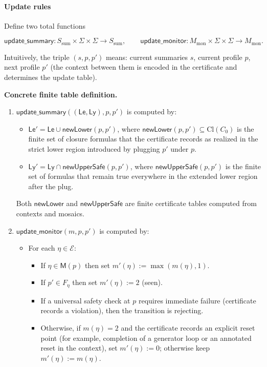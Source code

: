 \documentclass[11pt]{article}
\newcommand{\Cl}{\mathrm{Cl}}
\begin{document}
\paragraph{Update rules}
Define two total functions


\[
\mathsf{update\_summary}: S_{\mathrm{sum}}\times\Sigma\times\Sigma\to S_{\mathrm{sum}},
\qquad
\mathsf{update\_monitor}: M_{\mathrm{mon}}\times\Sigma\times\Sigma\to M_{\mathrm{mon}}.
\]


Intuitively, the triple $(s,p,p')$ means: current summaries $s$, current
profile $p$, next profile $p'$ (the context between them is encoded in the
certificate and determines the update table).

\textbf{Concrete finite table definition.}
\begin{enumerate}
  \item $\mathsf{update\_summary}((\mathsf{Le},\mathsf{Ly}),p,p')$ is computed by:
    \begin{itemize}
      \item $\mathsf{Le}'=\mathsf{Le}\cup \mathsf{newLower}(p,p')$, where
        $\mathsf{newLower}(p,p')\subseteq\Cl(C_0)$ is the finite set of closure
        formulas that the certificate records as realized in the strict lower
        region introduced by plugging $p'$ under $p$.
      \item $\mathsf{Ly}'=\mathsf{Ly}\cap \mathsf{newUpperSafe}(p,p')$, where
        $\mathsf{newUpperSafe}(p,p')$ is the finite set of formulas that
        remain true everywhere in the extended lower region after the plug.
    \end{itemize}
    Both $\mathsf{newLower}$ and $\mathsf{newUpperSafe}$ are finite certificate
    tables computed from contexts and mosaics.
  \item $\mathsf{update\_monitor}(m,p,p')$ is computed by:
    \begin{itemize}
      \item For each $\eta\in\mathcal{E}$:
        \begin{itemize}
          \item If $\eta\in\mathsf{M}(p)$ then set $m'(\eta):=\max(m(\eta),1)$.
          \item If $p'\in F_\eta$ then set $m'(\eta):=2$ (seen).
          \item If a universal safety check at $p$ requires immediate failure
            (certificate records a violation), then the transition is rejecting.
	    \item  Otherwise, if $m(\eta)=2$ and the certificate records an explicit reset point (for example, completion of a generator loop or an annotated reset in the context), set $m'(\eta):=0$; otherwise keep $m'(\eta):=m(\eta)$.
        \end{itemize}
    \end{itemize}
\end{enumerate}
\end{document}
